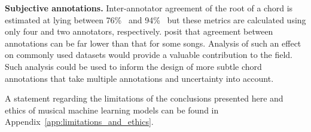 \textbf{Subjective annotations.} Inter-annotator agreement of the root of a chord is estimated at lying between 76\%~\citep{AnnotatorAgreement76} and 94\%~\citep{RockHarmonyAnalysis94} but these metrics are calculated using only four and two annotators, respectively. \citet{FourTimelyInsights} posit that agreement between annotations can be far lower than that for some songs. Analysis of such an effect on commonly used datasets would provide a valuable contribution to the field. Such analysis could be used to inform the design of more subtle chord annotations that take multiple annotations and uncertainty into account.

A statement regarding the limitations of the conclusions presented here and ethics of musical machine learning models can be found in Appendix~\ref{app:limitations_and_ethics}.

 